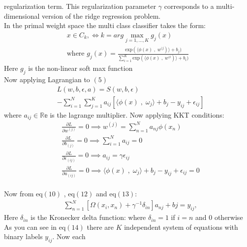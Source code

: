 \documentclass[conference]{IEEEtran}
\begin{document}
    regularization term. This regularization parameter $\gamma$ corresponds to a multi-dimensional version of the ridge
    regression problem.\\
    \doublespacing In the primal weight space the multi class classifier takes the form:
    \begin{align}
        x \in C_{k}, \Leftrightarrow k= arg \max_{j=1,\ldots,K} g_{j}(x) \\
        \text{where } g_{j}(x) = \frac{\text{exp}(\langle \phi(x)\;,\; w^{(j})\rangle + b_{j})}{\sum_{i=1}^{K} \text{exp}(\langle \phi(x)\;,\; w^{(i})\rangle + b_{i})}
    \end{align}
    Here $g_{j}$ is the non-linear soft max function \\
    Now applying Lagrangian to $(5)$
    \begin{align*}
        &L(w,b,\epsilon,a) = S(w,b,\epsilon)\\
        &- \sum_{i=1}^{N} \sum_{j=1}^{K} a_{ij}[\langle \phi(x) \;,\; \omega_{j}  \rangle + b_{j} - y_{ij} + \epsilon_{ij}]
    \end{align*}
    where $a_{ij} \in \mathbb{Re}$ is the lagrange multiplier.
    Now applying KKT conditions:
    \begin{align}
        &\frac{{\partial L}}{{\partial w^{(j)}}} = 0 \implies w^{(j)} = \sum_{n=1}^{N}a_{nj}\phi(x_{n}) \\
        &\frac{{\partial L}}{{\partial b_{(j)}}} = 0 \implies \sum_{i=1}^{N}a_{ij} = 0 \\
        &\frac{{\partial L}}{{\partial \epsilon_{(ij)}}} = 0 \implies
        a_{ij} = \gamma \epsilon_{ij} \\
        &\frac{{\partial L}}{{\partial a_{(ij)}}} = 0 \implies
        \langle \phi(x) \;,\; \omega_{j}  \rangle + b_{j} - y_{ij} + \epsilon_{ij} = 0
    \end{align}
    \\
    Now from eq$(10)$ , eq$(12)$ and eq$(13)$:
    \begin{align}
        &\sum_{n=1}^{N} [\Omega(x_{i},x_{n}) + \gamma^{-1}\delta_{in}]a_{nj} + b{j} = y_{ij},
    \end{align}
    Here $\delta_{in}$ is the Kronecker delta function: where $\delta_{in} =1$ if $i=n$ and $0$ otherwise \\
    As you can see in eq$(14)$ there are $K$ independent system of equations with binary labels $y_{ij}$. Now each
\end{document}
